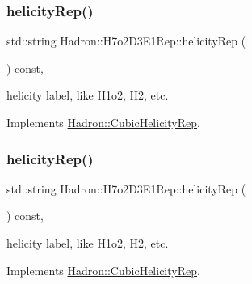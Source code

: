 \mbox{\label{structHadron_1_1H7o2D3E1Rep_a3e5ff6ed7ad90eeab64132f0434cdde5}} 
\subsubsection{\texorpdfstring{helicityRep()}{helicityRep()}\hspace{0.1cm}{\footnotesize\ttfamily [1/2]}}
{\footnotesize\ttfamily std\+::string Hadron\+::\+H7o2\+D3\+E1\+Rep\+::helicity\+Rep (\begin{DoxyParamCaption}{ }\end{DoxyParamCaption}) const\hspace{0.3cm}{\ttfamily [inline]}, {\ttfamily [virtual]}}

helicity label, like H1o2, H2, etc. 

Implements \mbox{\hyperlink{structHadron_1_1CubicHelicityRep_af1096946b7470edf0a55451cc662f231}{Hadron\+::\+Cubic\+Helicity\+Rep}}.

\mbox{\label{structHadron_1_1H7o2D3E1Rep_a3e5ff6ed7ad90eeab64132f0434cdde5}} 
\subsubsection{\texorpdfstring{helicityRep()}{helicityRep()}\hspace{0.1cm}{\footnotesize\ttfamily [2/2]}}
{\footnotesize\ttfamily std\+::string Hadron\+::\+H7o2\+D3\+E1\+Rep\+::helicity\+Rep (\begin{DoxyParamCaption}{ }\end{DoxyParamCaption}) const\hspace{0.3cm}{\ttfamily [inline]}, {\ttfamily [virtual]}}

helicity label, like H1o2, H2, etc. 

Implements \mbox{\hyperlink{structHadron_1_1CubicHelicityRep_af1096946b7470edf0a55451cc662f231}{Hadron\+::\+Cubic\+Helicity\+Rep}}.

\mbox{\label{structHadron_1_1H7o2D3E1Rep_a9b7fbb0d47650cdab86b3bb9832bbe75}} 
